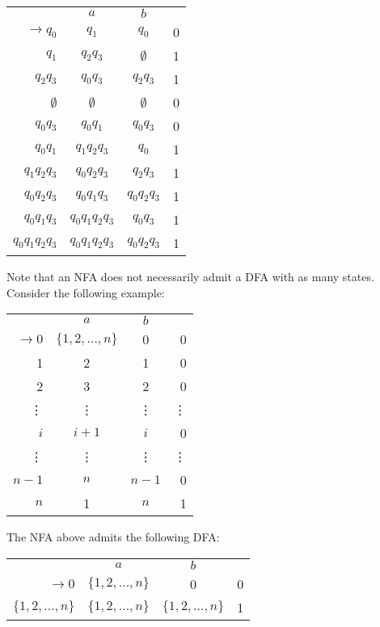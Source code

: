 \begin{center}\begin{tabular}{r c c r}
         & \(a\) & \(b\) & \\\cmidrule{2-3}
    \(\to q_0\) & \(q_1\) & \(q_0\) & 0 \\
          \(q_1\) & \(q_2q_3\) & \(\emptyset \) & 1 \\
          \(q_2q_3\) & \(q_0q_3\) & \(q_2q_3\) & 1 \\
          \(\emptyset \) & \(\emptyset \) & \(\emptyset \) & 0\\
          \(q_0q_3\) & \(q_0q_1\) & \(q_0q_3\) & 0 \\
          \(q_0q_1\) & \(q_1q_2q_3\) & \(q_0\) & 1 \\
          \(q_1q_2q_3\) & \(q_0q_2q_3\) & \(q_2q_3\) & 1 \\
          \(q_0q_2q_3\) & \(q_0q_1q_3\) & \(q_0q_2q_3\) & 1 \\
          \(q_0q_1q_3\) & \(q_0q_1q_2q_3\) & \(q_0q_3\) & 1 \\
          \(q_0q_1q_2q_3\) & \(q_0q_1q_2q_3\) & \(q_0q_2q_3\) & 1\\
\end{tabular}\end{center}

Note that an NFA does not necessarily admit a DFA with as many states. Consider the following example:

\begin{center}\begin{tabular}{r c c r}
     & \(a\) & \(b\) & \\\cmidrule{2-3}
\(\to 0\)&\( \{1,2,\hdots,n\} \) & 0 & 0 \\
     1 & 2 & 1 & 0 \\
     2 & 3 & 2 & 0 \\
     \vdots & \vdots & \vdots & \vdots \\
     \(i\) & \(i + 1\) & \(i\) & 0 \\
     \vdots & \vdots & \vdots & \vdots \\
     \(n-1\) & \(n\) & \(n-1\) & 0 \\
     \(n\) & 1 & \(n\) & 1
\end{tabular}\end{center}

The NFA above admits the following DFA\@:

\begin{center}\begin{tabular}{r c c r}
     & \(a\) & \(b\) & \\\cmidrule{2-3}
\(\to 0\)&\( \{1,2,\hdots,n\} \) & 0 & 0 \\
     \( \{1, 2,\hdots, n\} \) & \( \{1, 2,\hdots, n\} \) & \( \{1, 2,\hdots, n\} \) & 1 \\
\end{tabular}\end{center}

